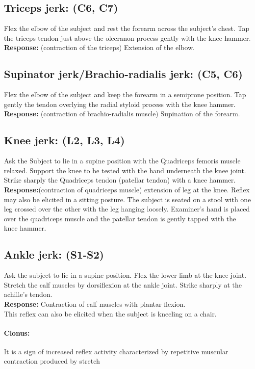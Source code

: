\documentclass[a4paper,12pt,openany,twoside]{book}
\begin{document}
\subsection*{Triceps jerk: (C6, C7)}
Flex the elbow of the subject and rest the forearm across the subject's chest. Tap the triceps tendon just above the olecranon process gently with the knee hammer.\\
\textbf{Response:} (contraction of the triceps) Extension of the elbow.
\subsection*{Supinator jerk/Brachio-radialis jerk: (C5, C6)}
Flex the elbow of the subject and keep the forearm in a semiprone position. Tap gently the tendon overlying the radial styloid process with the knee hammer.\\
\textbf{Response:} (contraction of brachio-radialis muscle) Supination of the forearm.
\subsection*{Knee jerk: (L2, L3, L4)}
Ask the Subject to lie in a supine position with the Quadriceps femoris muscle relaxed. Support the knee to be tested with the hand underneath the knee joint. Strike sharply the Quadriceps tendon (patellar tendon) with a knee hammer.\\
\textbf{Response:}(contraction of quadriceps muscle) extension of leg at the knee. Reflex may also be elicited in a sitting posture. The subject is seated on a stool with one leg crossed over the other with the leg hanging loosely. Examiner's hand is placed over the quadriceps muscle and the patellar tendon is gently tapped with the knee hammer.
\subsection*{Ankle jerk: (S1-S2)}
Ask the subject to lie in a supine position. Flex the lower limb at the knee joint. Stretch the calf muscles by dorsiflexion at the ankle joint. Strike sharply at the achille's tendon.\\
\textbf{Response:} Contraction of calf muscles with plantar flexion.\\
This reflex can also be elicited when the subject is kneeling on a chair.
\paragraph{Clonus:}
It is a sign of increased reflex activity characterized by repetitive muscular contraction produced by stretch
\end{document}
